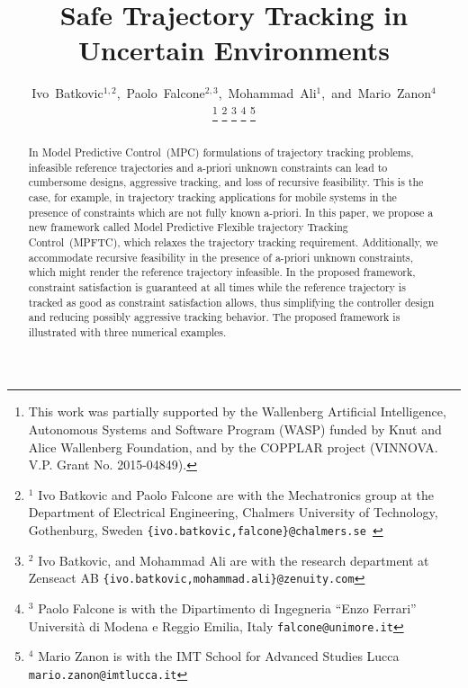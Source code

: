 \documentclass[journal]{IEEEtran}
\begin{document}
	\title{Safe Trajectory Tracking in Uncertain Environments}
	
	\author{Ivo~Batkovic$^{1,2}$,~Paolo~Falcone$^{2,3}$,~Mohammad~Ali$^1$,~and~Mario~Zanon$^4$
		
		\thanks{This work was partially supported by the Wallenberg Artificial Intelligence, Autonomous Systems and Software Program (WASP) funded by Knut and Alice Wallenberg Foundation, and by the COPPLAR project (VINNOVA. V.P. Grant No. 2015-04849).
		}	
		\thanks{$^{1}$ Ivo Batkovic and Paolo Falcone are with the Mechatronics group at the Department of Electrical Engineering, Chalmers University of Technology, Gothenburg, Sweden {\tt\footnotesize \{ivo.batkovic,falcone\}@chalmers.se }}
		\thanks{$^{2}$ Ivo Batkovic, and Mohammad Ali are with the research department at Zenseact AB {\tt\footnotesize \{ivo.batkovic,mohammad.ali\}@zenuity.com}}
		\thanks{$^{3}$ Paolo Falcone is with the Dipartimento di Ingegneria ``Enzo Ferrari'' Universit\`a di Modena e Reggio Emilia, Italy {\tt\footnotesize falcone@unimore.it}}
		\thanks{$^{4}$ Mario Zanon is with the IMT School for Advanced Studies Lucca {\tt\footnotesize mario.zanon@imtlucca.it}}}
	
	
	
	\maketitle
	
	\begin{abstract}
		In Model Predictive Control~(MPC) formulations of trajectory tracking problems, infeasible reference trajectories and a-priori unknown constraints can lead to cumbersome designs, aggressive tracking, and loss of recursive feasibility. This is the case, for example, in trajectory tracking applications for mobile systems in the presence of constraints which are not fully known a-priori. In this paper, we propose a new framework called Model Predictive Flexible trajectory Tracking Control~(MPFTC), which relaxes the trajectory tracking requirement. Additionally, we accommodate recursive feasibility in the presence of a-priori unknown constraints, which might render the reference trajectory infeasible. In the proposed framework, constraint satisfaction is guaranteed at all times while the reference trajectory is tracked as good as constraint satisfaction allows, thus simplifying the controller design and reducing possibly aggressive tracking behavior. The proposed framework is illustrated with three numerical examples. 
	\end{abstract}
	
\end{document}
